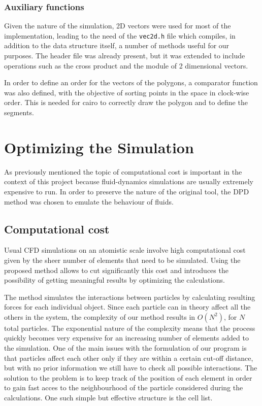 \documentclass[]{usiinfbachelorproject}
\begin{document}
\subsubsection{Auxiliary functions}
Given the nature of the simulation, 2D vectors were used for most of the implementation, 
leading to the need of the \texttt{vec2d.h} file which compiles, in addition to the data structure itself, 
a number of methods useful for our purposes. The header file was already present, but it was extended to include operations 
such as the cross product and the module of 2 dimensional vectors.

In order to define an order for the vectors of the polygons, a comparator function was also defined, with the objective 
of sorting points in the space in clock-wise order. This is needed for cairo to correctly 
draw the polygon and to define the segments.

\newpage
\section{Optimizing the Simulation}
As previously mentioned the topic of computational cost is important in the context of this project 
because fluid-dynamics simulations are usually extremely expensive to run. In order to preserve the nature 
of the original tool, the DPD method was chosen to emulate the behaviour of fluids.

\subsection{Computational cost}
Usual CFD simulations on an atomistic scale involve high computational cost given by the sheer 
number of elements that need to be simulated. Using the proposed method allows to cut significantly this 
cost and introduces the possibility of getting meaningful results by optimizing the 
calculations. 

The method simulates the interactions between particles by calculating resulting forces for each individual object. 
Since each particle can in theory affect all the others in the system, the complexity of our method results in 
$O(N^2)$, for $N$ total particles. The exponential nature of the complexity means that the process quickly becomes 
very expensive for an increasing number of elements added to the simulation. One of the main issues with the formulation of 
our program is that particles affect each other only if they are within a certain cut-off distance, but with no prior information 
we still have to check all possible interactions. The solution to the problem is to keep track of 
the position of each element in order to gain fast acces to the neighbourhood of the particle considered during the 
calculations. One such simple but effective structure is the cell list.
\end{document}
